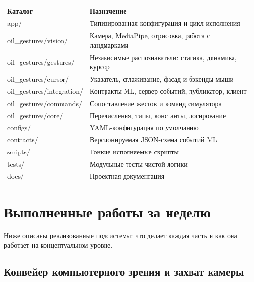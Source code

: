 \documentclass[11pt,a4paper]{article}
\begin{document}
\begin{center}
\begin{tabular}{>{\ttfamily}l l}
\toprule
\normalfont\textbf{Каталог} & \textbf{Назначение} \\
\midrule
app/                 & Типизированная конфигурация и цикл исполнения \\
oil\_gestures/vision/  & Камера, MediaPipe, отрисовка, работа с ландмарками \\
oil\_gestures/gestures/ & Независимые распознаватели: статика, динамика, курсор \\
oil\_gestures/cursor/   & Указатель, сглаживание, фасад и бэкенды мыши \\
oil\_gestures/integration/ & Контракты ML, сервер событий, публикатор, клиент \\
oil\_gestures/commands/ & Сопоставление жестов и команд симулятора \\
oil\_gestures/core/     & Перечисления, типы, константы, логирование \\
configs/             & YAML-конфигурация по умолчанию \\
contracts/           & Версионируемая JSON-схема событий ML \\
scripts/             & Тонкие исполняемые скрипты \\
tests/               & Модульные тесты чистой логики \\
docs/                & Проектная документация \\
\bottomrule
\end{tabular}
\end{center}

\section{Выполненные работы за неделю}

Ниже описаны реализованные подсистемы: что делает каждая часть и как она работает на
концептуальном уровне.

\subsection{Конвейер компьютерного зрения и захват камеры}
\end{document}
